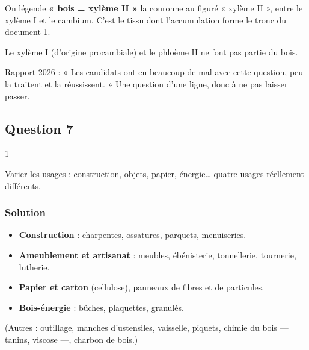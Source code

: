\documentclass[11pt,a4paper]{article}
\providecommand{\tightlist}{\setlength{\itemsep}{0pt}\setlength{\parskip}{0pt}}
\begin{document}
On légende \textbf{« bois = xylème II »} la couronne au figuré « xylème II », entre le xylème I et le cambium. C'est le tissu dont l'accumulation forme le tronc du document 1.

\begin{piege}

Le xylème I (d'origine procambiale) et le phloème II ne font pas partie du bois.

\end{piege}

\begin{jury}

Rapport 2026 : « Les candidats ont eu beaucoup de mal avec cette question, peu la traitent et la réussissent. » Une question d'une ligne, donc à ne pas laisser passer.

\end{jury}

\hypertarget{question-7}{%
\subsection{Question 7}\label{question-7}}

\begin{indication}{1}

Varier les usages : construction, objets, papier, énergie\ldots{} quatre usages réellement différents.

\end{indication}

\hypertarget{solution-6}{%
\subsubsection{Solution}\label{solution-6}}

\begin{itemize}
\tightlist
\item
  \textbf{Construction} : charpentes, ossatures, parquets, menuiseries.
\item
  \textbf{Ameublement et artisanat} : meubles, ébénisterie, tonnellerie, tournerie, lutherie.
\item
  \textbf{Papier et carton} (cellulose), panneaux de fibres et de particules.
\item
  \textbf{Bois-énergie} : bûches, plaquettes, granulés.
\end{itemize}

(Autres : outillage, manches d'ustensiles, vaisselle, piquets, chimie du bois --- tanins, viscose ---, charbon de bois.)
\end{document}
